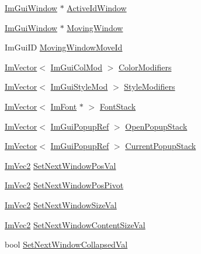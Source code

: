 \begin{DoxyCompactItemize}
\item 
\hyperlink{struct_im_gui_window}{Im\+Gui\+Window} $\ast$ \hyperlink{struct_im_gui_context_a95a35b5d82d3fdea28b71580dc6a9618}{Active\+Id\+Window}
\item 
\hyperlink{struct_im_gui_window}{Im\+Gui\+Window} $\ast$ \hyperlink{struct_im_gui_context_a28078cc22f615213fd8544016cd6ae20}{Moving\+Window}
\item 
Im\+Gui\+ID \hyperlink{struct_im_gui_context_abfd9589ba8b4d6b78bd24d46696ed820}{Moving\+Window\+Move\+Id}
\item 
\hyperlink{class_im_vector}{Im\+Vector}$<$ \hyperlink{struct_im_gui_col_mod}{Im\+Gui\+Col\+Mod} $>$ \hyperlink{struct_im_gui_context_aeb58091b545cc794c99487b8e66daf43}{Color\+Modifiers}
\item 
\hyperlink{class_im_vector}{Im\+Vector}$<$ \hyperlink{struct_im_gui_style_mod}{Im\+Gui\+Style\+Mod} $>$ \hyperlink{struct_im_gui_context_ac0feba14c36c7dff87211c3650815be7}{Style\+Modifiers}
\item 
\hyperlink{class_im_vector}{Im\+Vector}$<$ \hyperlink{struct_im_font}{Im\+Font} $\ast$ $>$ \hyperlink{struct_im_gui_context_a8a6a9f23604fe0d0b51c78e45e4432b0}{Font\+Stack}
\item 
\hyperlink{class_im_vector}{Im\+Vector}$<$ \hyperlink{struct_im_gui_popup_ref}{Im\+Gui\+Popup\+Ref} $>$ \hyperlink{struct_im_gui_context_af6c0e07cff9641d31bdf22b7e7df2842}{Open\+Popup\+Stack}
\item 
\hyperlink{class_im_vector}{Im\+Vector}$<$ \hyperlink{struct_im_gui_popup_ref}{Im\+Gui\+Popup\+Ref} $>$ \hyperlink{struct_im_gui_context_a7b2472ca52bcccb98e0db1a8b1b78853}{Current\+Popup\+Stack}
\item 
\hyperlink{struct_im_vec2}{Im\+Vec2} \hyperlink{struct_im_gui_context_a8cb5445e4f740af210aa1794707dffbc}{Set\+Next\+Window\+Pos\+Val}
\item 
\hyperlink{struct_im_vec2}{Im\+Vec2} \hyperlink{struct_im_gui_context_a0da8611453fefe211a63abce142f9d74}{Set\+Next\+Window\+Pos\+Pivot}
\item 
\hyperlink{struct_im_vec2}{Im\+Vec2} \hyperlink{struct_im_gui_context_a80a09eeab06dd8abaa79cc5d26998af4}{Set\+Next\+Window\+Size\+Val}
\item 
\hyperlink{struct_im_vec2}{Im\+Vec2} \hyperlink{struct_im_gui_context_aa861c8e8d3b52e2fe8b581a4a132c39b}{Set\+Next\+Window\+Content\+Size\+Val}
\item 
bool \hyperlink{struct_im_gui_context_a81c9c14d3ab622586aa5ca0866634b21}{Set\+Next\+Window\+Collapsed\+Val}
\item 

\end{DoxyCompactItemize}
